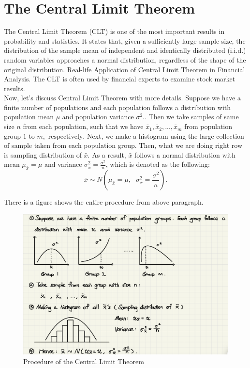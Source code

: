 \chapter{The Central Limit Theorem}
\label{sec.matrix}
\pagestyle{myheadings}  

The Central Limit Theorem (CLT) is one of the most important results in probability and statistics. It states that, given a sufficiently large sample size, the distribution of the sample mean of independent and identically distributed (i.i.d.) random variables approaches a normal distribution, regardless of the shape of the original distribution. Real-life Application of Central Limit Theorem in Financial Analysis. The CLT is often used by financial experts to examine stock market results.\\

Now, let's discuss Central Limit Theorem with more details. Suppose we have a finite number of populations and each population follows a distribution with population mean $\mu$ and population variance $\sigma^2.$. Then we take samples of same size $n$ from each population, such that we have $\bar{x}_1, \bar{x}_2, ..., \bar{x}_m$ from population group $1 \text{ to } m, \text{ respectively.}$ Next, we make a histogram using the large collection of sample taken from each population group. Then, what we are doing right row is sampling distribution of $\bar{x}$. As a result, $\bar{x}$ follows a normal distribution with mean $\mu_{\bar{x}} = \mu$ and variance $\sigma_{\bar{x}}^{2} = \frac{\sigma^2}{n}$, which is denoted as the following: \[ \bar{x} \sim N(\mu_{\bar{x}} = \mu, \text{ } \sigma_{\bar{x}}^{2} = \frac{\sigma^2}{n}).\]

There is a figure shows the entire procedure from above paragraph.

\begin{figure}[H]
 \centering
 \includegraphics[scale=0.15]{Section3/Img3/CLT.jpg}
 \caption{Procedure of the Central Limit Theorem}
\end{figure}

